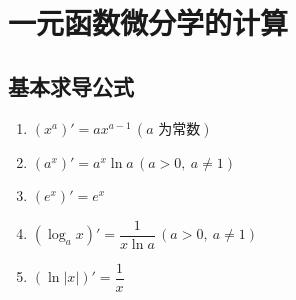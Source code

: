 \documentclass[../book.tex]{subfiles}
\begin{document}
    \section{一元函数微分学的计算}

    \subsection{基本求导公式}

    \begin{enumerate}
        \item $(x^a)' = a x^{a-1}\,(a \text{ 为常数})$

        \item $(a^x)' = a^x \ln a \,(a>0,\ a\neq1)$

        \item $(e^x)' = e^x$

        \item $(\log_a x)' = \dfrac{1}{x\ln a}
        \,(a>0,\ a\neq1)$

        \item $(\ln |x|)' = \dfrac{1}{x}$


\end{enumerate}
\end{document}
